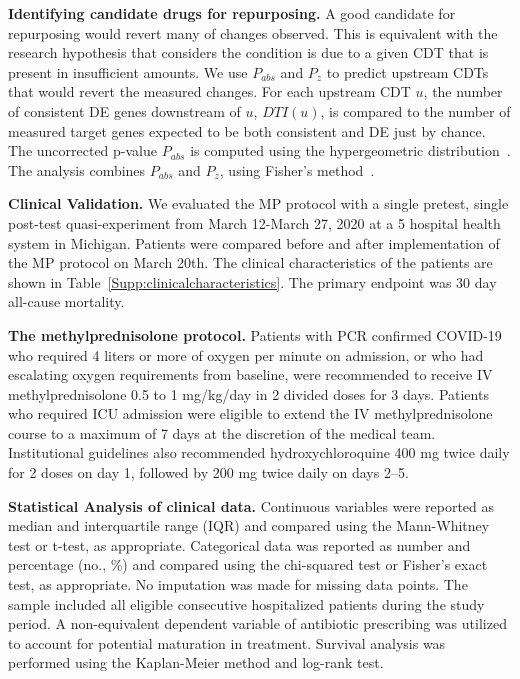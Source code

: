 \textbf{Identifying candidate drugs for repurposing.}
A good candidate for repurposing would revert many of changes observed. This is equivalent  with the research hypothesis that considers the condition is due to a given CDT that is present in insufficient amounts.
We use $P_{abs}$ and $P_z$ to predict upstream CDTs that would revert the measured changes. 
For each upstream CDT $u$, the number of consistent DE genes downstream of $u$, $DTI(u)$, is compared to the number of measured target genes expected to be both consistent and DE just by chance. The uncorrected p-value $P_{abs}$ is computed using the hypergeometric distribution~\cite{DraghiciOT:2003, DraghiciBook:2011}. The analysis combines $P_{abs}$ and $P_z$, using  Fisher's method~\cite{fisher1925statistical}. %



\textbf{Clinical Validation.} 
We evaluated the MP protocol with a single pretest, single post-test quasi-experiment from March 12-March 27, 2020 at a 5 hospital health system in Michigan. Patients were compared before and after implementation of the MP protocol on March 20th. The clinical characteristics of the patients are shown in Table~\ref{Supp:clinicalcharacteristics}. 
The primary endpoint was 30 day all-cause mortality.  

\textbf{The methylprednisolone protocol.}  
Patients with PCR confirmed COVID-19 who required 4 liters or more of oxygen per minute on admission, or who had escalating oxygen requirements from baseline, were recommended to receive IV methylprednisolone 0.5 to 1 mg/kg/day in 2 divided doses for 3 days. Patients who required ICU admission were eligible to extend the IV methylprednisolone course to a maximum of 7 days at the discretion of the medical team. Institutional guidelines also recommended hydroxychloroquine 400 mg twice daily for 2 doses on day 1, followed by 200 mg twice daily on days 2--5.

\textbf{Statistical Analysis of clinical data.} Continuous variables were reported as median and interquartile range (IQR) and compared using the Mann-Whitney test or t-test, as appropriate. Categorical data was reported as number and percentage (no., \%) and compared using the chi-squared test or Fisher's exact test, as appropriate. No imputation was made for missing data points. The sample included all eligible consecutive hospitalized patients during the study period. A non-equivalent dependent variable of antibiotic prescribing was utilized to account for potential maturation in treatment. Survival analysis was performed using the Kaplan-Meier method and log-rank test. 


